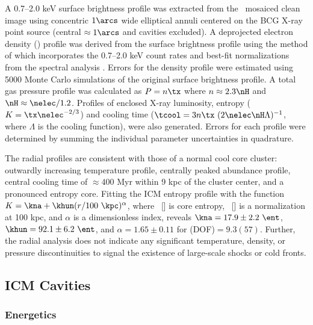 \documentclass[11pt, preprint]{aastex}
\begin{document}
A 0.7--2.0 keV surface brightness profile was extracted from the
\cxo\ mosaiced clean image using concentric $1\arcs$ wide elliptical
annuli centered on the BCG X-ray point source (central $\approx
1\arcs$ and cavities excluded). A deprojected electron density
(\nelec) profile was derived from the surface brightness profile using
the method of \citet{kriss83} which incorporates the 0.7--2.0 keV
count rates and best-fit normalizations from the spectral analysis
\citep[see][for details]{accept}. Errors for the density profile were
estimated using 5000 Monte Carlo simulations of the original surface
brightness profile. A total gas pressure profile was calculated as $P
= n \tx$ where $n \approx 2.3 \nH$ and $\nH \approx
\nelec/1.2$. Profiles of enclosed X-ray luminosity, entropy ($K = \tx
\nelec^{-2/3}$) and cooling time ($\tcool = 3 n \tx~(2 \nelec \nH
\Lambda)^{-1}$, where $\Lambda$ is the cooling function), were also
generated. Errors for each profile were determined by summing the
individual parameter uncertainties in quadrature.

The radial profiles are consistent with those of a normal cool core
cluster: outwardly increasing temperature profile, centrally peaked
abundance profile, central cooling time of $\approx 400$ Myr within 9
kpc of the cluster center, and a pronounced entropy core. Fitting the
ICM entropy profile with the function $K = \kna +\khun (r/100
~\kpc)^{\alpha}$, where \kna\ [\ent] is core entropy, \khun\ [\ent] is
a normalization at 100 kpc, and $\alpha$ is a dimensionless index,
reveals $\kna = 17.9 \pm 2.2 ~\ent$, $\khun = 92.1 \pm 6.2 ~\ent$, and
$\alpha = 1.65 \pm 0.11$ for \chisq(DOF)$ = 9.3(57)$. Further, the
radial analysis does not indicate any significant temperature,
density, or pressure discontinuities to signal the existence of
large-scale shocks or cold fronts.

\subsection{ICM Cavities}
\label{sec:cavities}

\subsubsection{Energetics}
\label{sec:ecav}
\end{document}
